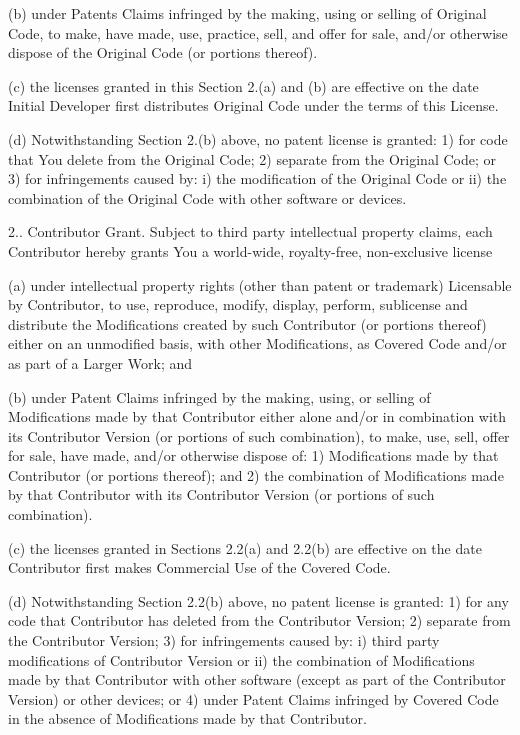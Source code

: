 \begin{DoxyEnumerate}
(b) under Patents Claims infringed by the making, using or selling of Original Code, to make, have made, use, practice, sell, and offer for sale, and/or otherwise dispose of the Original Code (or portions thereof).

(c) the licenses granted in this Section 2.(a) and (b) are effective on the date Initial Developer first distributes Original Code under the terms of this License.

(d) Notwithstanding Section 2.(b) above, no patent license is granted\+: 1) for code that You delete from the Original Code; 2) separate from the Original Code; or 3) for infringements caused by\+: i) the modification of the Original Code or ii) the combination of the Original Code with other software or devices.

2.. Contributor Grant. Subject to third party intellectual property claims, each Contributor hereby grants You a world-\/wide, royalty-\/free, non-\/exclusive license \begin{DoxyVerb} (a)  under intellectual property rights (other than patent or
 trademark) Licensable by Contributor, to use, reproduce, modify,
 display, perform, sublicense and distribute the Modifications
 created by such Contributor (or portions thereof) either on an
 unmodified basis, with other Modifications, as Covered Code
 and/or as part of a Larger Work; and

 (b) under Patent Claims infringed by the making, using, or
 selling of  Modifications made by that Contributor either alone
 and/or in combination with its Contributor Version (or portions
 of such combination), to make, use, sell, offer for sale, have
 made, and/or otherwise dispose of: 1) Modifications made by that
 Contributor (or portions thereof); and 2) the combination of
 Modifications made by that Contributor with its Contributor
 Version (or portions of such combination).

 (c) the licenses granted in Sections 2.2(a) and 2.2(b) are
 effective on the date Contributor first makes Commercial Use of
 the Covered Code.

 (d)    Notwithstanding Section 2.2(b) above, no patent license is
 granted: 1) for any code that Contributor has deleted from the
 Contributor Version; 2)  separate from the Contributor Version;
 3)  for infringements caused by: i) third party modifications of
 Contributor Version or ii)  the combination of Modifications made
 by that Contributor with other software  (except as part of the
 Contributor Version) or other devices; or 4) under Patent Claims
 infringed by Covered Code in the absence of Modifications made by
 that Contributor.
\end{DoxyVerb}


\end{DoxyEnumerate}
